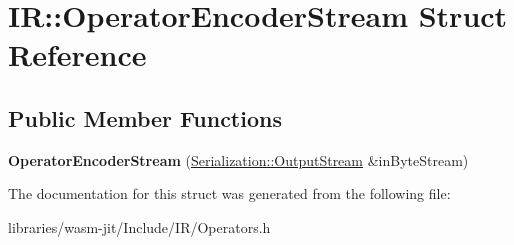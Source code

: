 \hypertarget{struct_i_r_1_1_operator_encoder_stream}{}\section{IR\+:\+:Operator\+Encoder\+Stream Struct Reference}
\label{struct_i_r_1_1_operator_encoder_stream}
\subsection*{Public Member Functions}
\begin{DoxyCompactItemize}
\item 
\mbox{\label{struct_i_r_1_1_operator_encoder_stream_a86e2fe019c94880b58cab7ea6ab808d2}} 
{\bfseries Operator\+Encoder\+Stream} (\mbox{\hyperlink{struct_serialization_1_1_output_stream}{Serialization\+::\+Output\+Stream}} \&in\+Byte\+Stream)
\end{DoxyCompactItemize}


The documentation for this struct was generated from the following file\+:\begin{DoxyCompactItemize}
\item 
libraries/wasm-\/jit/\+Include/\+I\+R/Operators.\+h\end{DoxyCompactItemize}
